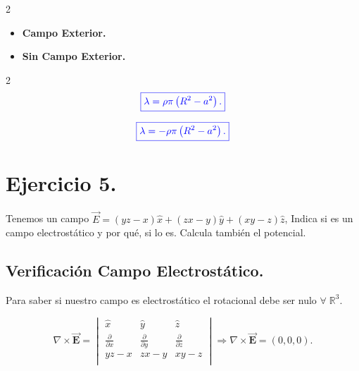 \documentclass[a4paper,12pt]{article} %
\begin{document}
\begin{multicols}{2}
	\begin{itemize}
		\item \textbf{Campo Exterior.}
	\end{itemize}

	\columnbreak

	\begin{itemize}
		\item \textbf{Sin Campo Exterior.}
	\end{itemize}
\end{multicols}

\begin{multicols}{2}
	\[\textcolor{blue}{\boxed{\lambda = \rho \pi \left(R^2 -a^2\right).}}\]

	\columnbreak

	\[\textcolor{blue}{\boxed{\lambda = - \rho \pi \left(R^2 -a^2\right).}}\]
\end{multicols}

\section{Ejercicio 5.}

\begin{justify}
	Tenemos un campo \(\vec{E} = \left( yz-x \right) \hat{x} + \left( zx - y \right) \hat{y} + \left(xy - z\right) \hat{z}\), Indica si es un campo electrostático y por qué, si lo es. Calcula también el potencial.
\end{justify}

\subsection{Verificación Campo Electrostático.}

\begin{justify}
	Para saber si nuestro campo es electrostático el rotacional debe ser nulo \(\forall \; \mathbb{R}^3. \)
\end{justify}

\[ \nabla \times \vec{\mathbf{E}} = \begin{vmatrix}
		\hat{x}                     & \hat{y}                     & \hat{z}                     \\
		\frac{\partial}{\partial x} & \frac{\partial}{\partial y} & \frac{\partial}{\partial z} \\
		yz - x                      & zx - y                      & xy - z                      \\
	\end{vmatrix} \Rightarrow
	\nabla \times \vec{\mathbf{E}} = \left( 0, 0, 0\right).
\]
\end{document}
